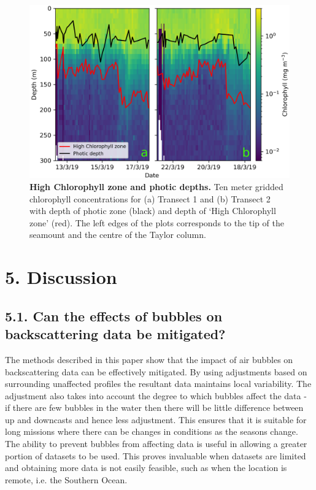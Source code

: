 \documentclass[
	a4paper, %
	10pt, %
	unnumberedsections, %
	twoside, %
]{LTJournalArticle}
\begin{document}
\begin{multicols}{2}
\begin{figure}[H] 
	\includegraphics[width=\linewidth]{Louis/figures/figureM.png}
	\caption{\textbf{High Chlorophyll zone and photic depths.} Ten meter gridded chlorophyll concentrations for (a) Transect 1 and (b) Transect 2 with depth of photic zone (black) and depth of ‘High Chlorophyll zone’ (red). The left edges of the plots corresponds to the tip of the seamount and the centre of the Taylor column.}
	\label{fig:M}
\end{figure}


\section{5. Discussion}
\subsection{5.1. Can the effects of bubbles on backscattering data be mitigated?}
The methods described in this paper show that the impact of air bubbles on backscattering data can be effectively mitigated. By using adjustments
based on surrounding unaffected profiles the resultant data maintains local variability. The adjustment also takes into account the degree to
which bubbles affect the data - if there are few bubbles in the water then there will be little difference between up and downcasts and hence
less adjustment. This ensures that it is suitable for long missions where there can be changes in conditions as the seasons change. The ability
to prevent bubbles from affecting data is useful in allowing a greater portion of datasets to be used. This proves invaluable when datasets are
limited and obtaining more data is not easily feasible, such as when the location is remote, i.e. the Southern Ocean.



\end{multicols}
\end{document}
